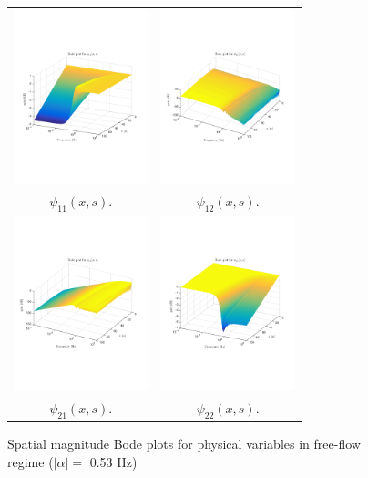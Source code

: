 \documentclass[a4paper, 10pt, conference]{ieeeconf}      %
\begin{document}
\begin{figure}
\centering
\begin{tabular}{cc}
\includegraphics[trim = 0mm 60mm 0mm 60mm, width = 3.9cm]{distr_psi_11}
&
\includegraphics[trim = 0mm 60mm 0mm 60mm, width = 3.9cm]{distr_psi_12}
\tabularnewline
$\psi_{11}(x,s)$.
&
$\psi_{12}(x,s)$.
\tabularnewline
\includegraphics[trim = 0mm 60mm 0mm 60mm, width = 3.9cm]{distr_psi_21}
&
\includegraphics[trim = 0mm 60mm 0mm 60mm, width = 3.9cm]{distr_psi_22}
\tabularnewline
$\psi_{21}(x,s)$.
&
$\psi_{22}(x,s)$.
\end{tabular}
\caption{Spatial magnitude Bode plots for physical variables in free-flow regime ($\left|\alpha\right| = $ 0.53 Hz)\label{fig:Magn_spatial_physx}}
\end{figure}
\end{document}
